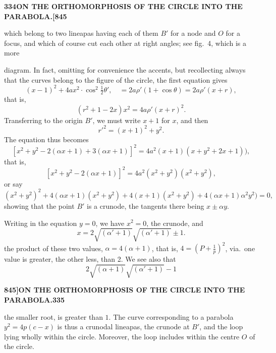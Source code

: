 \documentclass[11pt,a4paper]{book}
\begin{document}
\noindent\textbf{334}\hfill\textbf{ON THE ORTHOMORPHOSIS OF THE CIRCLE INTO THE PARABOLA.}\hfill\textbf{[845}

\bigskip

\noindent which belong to two lineapas having each of them $B'$ for a node and $O$ for a focus, and which of course cut each other at right angles; see fig.\ 4, which is a more

\begin{figure}[H]
\centering
{}
\end{figure}

diagram. In fact, omitting for convenience the accents, but recollecting always that the curves belong to the figure of the circle, the first equation gives
\[
(x - 1)^2 + 4ax^2 \cdot \cos^2\tfrac{1}{2}\theta', \quad = 2a\rho'(1 + \cos\theta) = 2a\rho'(x + r),
\]
that is,
\[
(r^2 + 1 - 2x)x^2 = 4a\rho'(x + r)^2.
\]
Transferring to the origin $B'$, we must write $x + 1$ for $x$, and then
\[
r'^2 = (x + 1)^2 + y^2.
\]
The equation thus becomes
\[
[x^2 + y^2 - 2(\alpha x + 1) + 3(\alpha x + 1)]^2 = 4a^2(x + 1)(x + y^2 + 2x + 1)),
\]
that is,
\[
[x^2 + y^2 - 2(\alpha x + 1)]^2 = 4a^2(x^2 + y^2)(x^2 + y^2),
\]
or say
\[
(x^2 + y^2)^2 + 4(\alpha x + 1)(x^2 + y^2) + 4(x + 1)(x^2 + y^2) + 4(\alpha x + 1)\alpha^2y^2) = 0,
\]
showing that the point $B'$ is a crunode, the tangents there being $x \pm \alpha y$.

Writing in the equation $y = 0$, we have $x^2 = 0$, the crunode, and
\[
x = 2\sqrt{(\alpha' + 1)}\sqrt{(\alpha' + 1)} \pm 1.
\]
the product of these two values, $\alpha = 4(\alpha + 1)$, that is, $4 = \left(P + \frac{1}{p}\right)^2$, via.\ one value is greater, the other less, than 2. We see also that
\[
2\sqrt{(\alpha + 1)}\sqrt{(\alpha' + 1)} - 1
\]

\newpage
\setcounter{page}{335}

\noindent\textbf{845]}\hfill\textbf{ON THE ORTHOMORPHOSIS OF THE CIRCLE INTO THE PARABOLA.}\hfill\textbf{335}

\bigskip

\noindent the smaller root, is greater than $1$. The curve corresponding to a parabola $y^2 = 4p(c - x)$ is thus a crunodal lineapas, the crunode at $B'$, and the loop lying wholly within the circle. Moreover, the loop includes within the centre $O$ of the circle.
\end{document}
